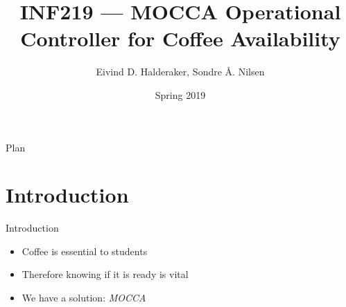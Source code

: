 \documentclass[presentation]{beamer}
\author{Eivind D. Halderaker, Sondre Å. Nilsen}
\date{Spring 2019}
\title{INF219 --- MOCCA Operational Controller for Coffee Availability}
\begin{document}
\maketitle
\begin{frame}{Plan}
\tableofcontents
\end{frame}


\section{Introduction}
\label{sec:orgc3c3e1f}
\begin{frame}[label={sec:org470ab70}]{Introduction}
\begin{itemize}
\item Coffee is essential to students
\item Therefore knowing if it is ready is vital
\item We have a solution: \emph{MOCCA}
\end{itemize}
\end{frame}
\end{document}
